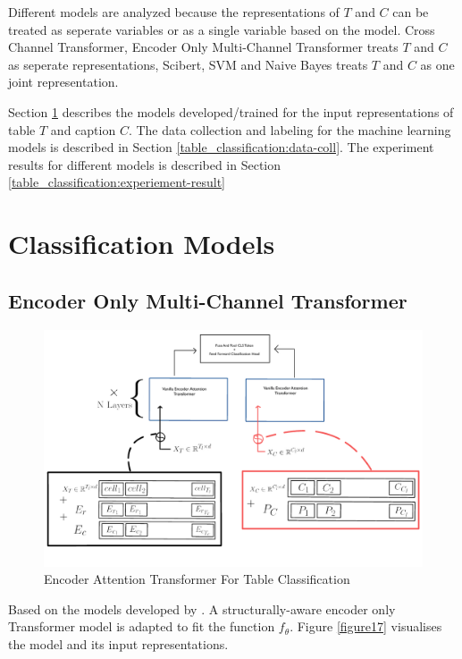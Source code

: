 Different models are analyzed because the representations of $T$ and $C$ can be treated as seperate variables or as a single variable based on the model. Cross Channel Transformer, Encoder Only Multi-Channel Transformer treats $T$ and $C$ as seperate representations, Scibert, SVM and Naive Bayes treats $T$ and $C$ as one joint representation. 

Section \ref{table_classification:models} describes the models developed/trained for the input representations of table $T$ and caption $C$. The data collection and labeling for the machine learning models is described in Section \ref{table_classification:data-coll}. The experiment results for different models is described in Section \ref{table_classification:experiement-result}

\section{Classification Models}
\label{table_classification:models}

\subsection{Encoder Only Multi-Channel Transformer}
\label{table_classification:models:encoder-model}
\begin{figure}[h]
    \centering
    \includegraphics[width=\maxwidth{\textwidth}]{src/images/tabmod-enconly.pdf}
    \caption{Encoder Attention Transformer For Table Classification}
    \label{figure\arabic{figurecounter}}
\end{figure}
Based on the models developed by \cite{deng2020turl}. A structurally-aware encoder only Transformer model is adapted to fit the function $f_\theta$. Figure \ref{figure17} visualises the model and its input representations.

